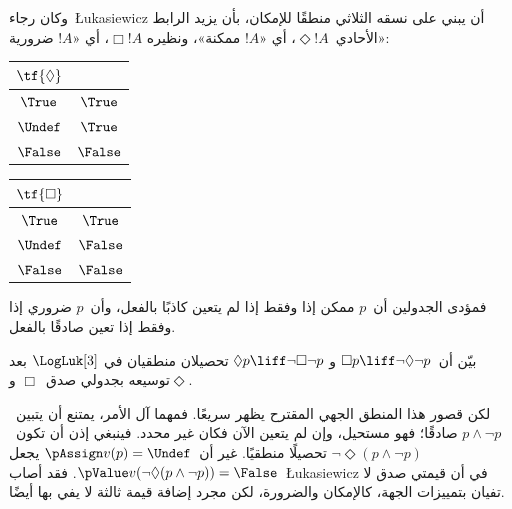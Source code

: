 \documentclass[../../../include/open-logic-section]{subfiles}
\begin{document}
وكان رجاء~\L ukasiewicz أن يبني على نسقه الثلاثي منطقًا للإمكان،
بأن يزيد الرابط الأحادي~$\Diamond !A$، أي «$!A$ ممكنة»، ونظيره
$\Box !A$، أي «$!A$ ضرورية»:
\begin{center}
  \begin{tabular}{c|c}
    $\tf{\Diamond}$ & \\
    \hline
    $\True$ & $\True$ \\
    $\Undef$ & $\True$ \\
    $\False$ & $\False$
  \end{tabular}
  \quad
  \begin{tabular}{c|c}
    $\tf{\Box}$ & \\
    \hline
    $\True$ & $\True$ \\
    $\Undef$ & $\False$ \\
    $\False$ & $\False$
  \end{tabular}
\end{center}
فمؤدى الجدولين أن~$p$ ممكن إذا وفقط إذا لم يتعين كاذبًا بالفعل،
وأن~$p$ ضروري إذا وفقط إذا تعين صادقًا بالفعل.

\begin{prob}
  بيّن أن~$\Box p \liff \lnot\Diamond \lnot p$ و
  $\Diamond p \liff \lnot \Box \lnot p$ تحصيلان منطقيان في
  $\LogLuk[3]$ بعد توسيعه بجدولي صدق~$\Box$ و$\Diamond$.
\end{prob}

لكن قصور هذا المنطق الجهي المقترح يظهر سريعًا. فمهما آل الأمر، يمتنع
أن يتبين~$p \land \lnot p$ صادقًا؛ فهو مستحيل، وإن لم يتعين الآن
فكان غير محدد. فينبغي إذن أن تكون~$\lnot \Diamond(p \land \lnot p)$
تحصيلًا منطقيًا. غير أن~$\pAssign v(p) = \Undef$ يجعل
$\pValue v(\lnot \Diamond(p \land \lnot p)) = \False$.
فقد أصاب~\L ukasiewicz في أن قيمتي صدق لا تفيان بتمييزات الجهة،
كالإمكان والضرورة، لكن مجرد إضافة قيمة ثالثة لا يفي بها أيضًا.
\end{document}
